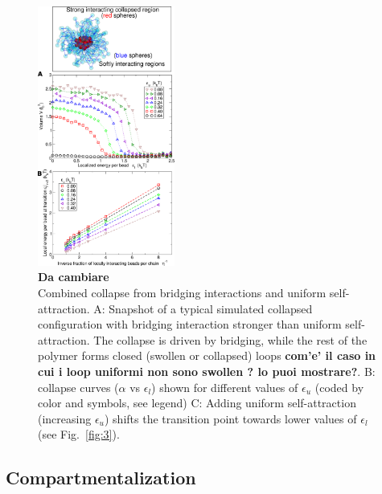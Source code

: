 \documentclass[a4paper,12pt,pre,superscriptaddress]{revtex4}
\begin{document}
\begin{figure}
  \centering
  \includegraphics[width=0.4\textwidth]{fig4}
  \caption{\textbf{Da cambiare \\}Combined collapse from bridging
    interactions and uniform self-attraction.  A: Snapshot of a
    typical simulated collapsed configuration with bridging
    interaction stronger than uniform self-attraction. The collapse is
    driven by bridging, while the rest of the polymer forms closed
    (swollen or collapsed) loops \textbf{com'e' il caso in cui i loop
      uniformi non sono swollen ? lo puoi mostrare?}.
    B: collapse curves ($\alpha$ vs $\epsilon_l$) shown for
    different values of $\epsilon_u$ (coded by color and symbols, see
    legend)
%
    C: Adding uniform self-attraction (increasing $\epsilon_u$) shifts
    the transition point towards lower values of $\epsilon_l$ (see
    Fig.~\ref{fig:3}). }
  \label{fig:4}
\end{figure}


\subsection*{Compartmentalization}
\end{document}
